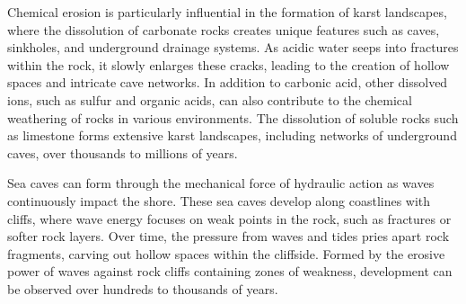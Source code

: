 Chemical erosion is particularly influential in the formation of karst landscapes, where the dissolution of carbonate rocks creates unique features such as caves, sinkholes, and underground drainage systems. As acidic water seeps into fractures within the rock, it slowly enlarges these cracks, leading to the creation of hollow spaces and intricate cave networks. In addition to carbonic acid, other dissolved ions, such as sulfur and organic acids, can also contribute to the chemical weathering of rocks in various environments. The dissolution of soluble rocks such as limestone forms extensive karst landscapes, including networks of underground caves, over thousands to millions of years.





Sea caves can form through the mechanical force of hydraulic action as waves continuously impact the shore. These sea caves develop along coastlines with cliffs, where wave energy focuses on weak points in the rock, such as fractures or softer rock layers. Over time, the pressure from waves and tides pries apart rock fragments, carving out hollow spaces within the cliffside. Formed by the erosive power of waves against rock cliffs containing zones of weakness, development can be observed over hundreds to thousands of years.

